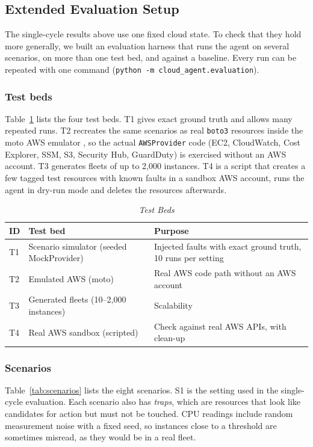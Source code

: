 \documentclass{ieeeaccess}
\begin{document}
\subsection{Extended Evaluation Setup}
\label{sec:extended}

The single-cycle results above use one fixed cloud state. To check that they
hold more generally, we built an evaluation harness that runs the agent on
several scenarios, on more than one test bed, and against a baseline. Every
run can be repeated with one command (\texttt{python -m cloud\_agent.evaluation}).

\subsubsection{Test beds}
Table~\ref{tab:testbeds} lists the four test beds. T1 gives exact ground truth
and allows many repeated runs. T2 recreates the same scenarios as real
\texttt{boto3} resources inside the moto AWS emulator \cite{moto2024}, so the
actual \texttt{AWSProvider} code (EC2, CloudWatch, Cost Explorer, SSM, S3,
Security Hub, GuardDuty) is exercised without an AWS account. T3 generates
fleets of up to 2,000 instances. T4 is a script that creates a few tagged test
resources with known faults in a sandbox AWS account, runs the agent in
dry-run mode and deletes the resources afterwards.

\begin{table}[ht]
\caption{\textit{Test Beds}}
\centering
\setlength{\tabcolsep}{3pt}
\begin{tabular}{p{0.5cm}p{2.4cm}p{4.6cm}}
\toprule
\textbf{ID} & \textbf{Test bed} & \textbf{Purpose} \\
\midrule
T1 & Scenario simulator (seeded MockProvider) & Injected faults with exact ground truth, 10 runs per setting \\
T2 & Emulated AWS (moto) & Real AWS code path without an AWS account \\
T3 & Generated fleets (10--2,000 instances) & Scalability \\
T4 & Real AWS sandbox (scripted) & Check against real AWS APIs, with clean-up \\
\bottomrule
\end{tabular}
\label{tab:testbeds}
\end{table}

\subsubsection{Scenarios}
Table~\ref{tab:scenarios} lists the eight scenarios. S1 is the setting used
in the single-cycle evaluation. Each scenario also has \emph{traps}, which are
resources that look like candidates for action but must not be touched. CPU
readings include random measurement noise with a fixed seed, so instances
close to a threshold are sometimes misread, as they would be in a real fleet.
\end{document}
